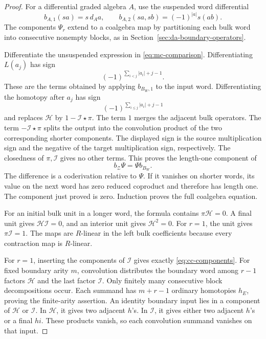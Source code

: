 \begin{proof}
For a differential graded algebra \(A\), use the suspended
word differential
\[
 b_{A,1}(sa)=s\,d_Aa,\qquad
 b_{A,2}(sa,sb)=(-1)^{|a|}s(ab).
\]
The components \(\Psi_r\) extend to a coalgebra map by
partitioning each bulk word into consecutive nonempty blocks,
as in Section~\ref{sec:da-boundary-operators}.

Differentiate the unsuspended expression in
\eqref{eq:mc-comparison}. Differentiating \(L(a_j)\) has sign
\[
 (-1)^{\sum_{i<j}|a_i|+j-1}.
\]
These are the terms obtained by applying \(b_{B_W,1}\) to
the input word. Differentiating the homotopy after \(a_j\)
has sign
\[
 (-1)^{\sum_{i\leq j}|a_i|+j-1}
\]
and replaces \(\mathcal H\) by \(1-\mathcal I\star\pi\).
The term \(1\) merges the adjacent bulk operators.
The term \(-\mathcal I\star\pi\) splits the output into the
convolution product of the two corresponding shorter components.
The displayed sign is the source multiplication sign and
the negative of the target multiplication sign, respectively.
The closedness of \(\pi,\mathcal I\) gives no other terms.
This proves the length-one component of
\[
 b_{\mathcal Z}\Psi=\Psi b_{B_W}.
\]
The difference is a coderivation relative to \(\Psi\).
If it vanishes on shorter words, its value on the next word
has zero reduced coproduct and therefore has length one.
The component just proved is zero. Induction proves the full
coalgebra equation.

For an initial bulk unit in a longer word, the formula
contains \(\pi\mathcal H=0\). A final unit gives
\(\mathcal H\mathcal I=0\), and an interior unit gives
\(\mathcal H^2=0\). For \(r=1\), the unit gives
\(\pi\mathcal I=1\).
The maps are \(R\)-linear in the left bulk coefficients
because every contraction map is \(R\)-linear.

For \(r=1\), inserting the components of \(\mathcal I\)
gives exactly \eqref{eq:cc-components}.
For fixed boundary arity \(m\), convolution distributes the
boundary word among \(r-1\) factors \(\mathcal H\) and the
last factor \(\mathcal I\). Only finitely many consecutive
block decompositions occur. Each summand has \(m+r-1\)
ordinary homotopies \(h_E\), proving the finite-arity assertion.
An identity boundary input lies in a component of
\(\mathcal H\) or \(\mathcal I\). In \(\mathcal H\), it gives
two adjacent \(h\)'s. In \(\mathcal I\), it gives either
two adjacent \(h\)'s or a final \(hi\). These products vanish,
so each convolution summand vanishes on that input.
\end{proof}

